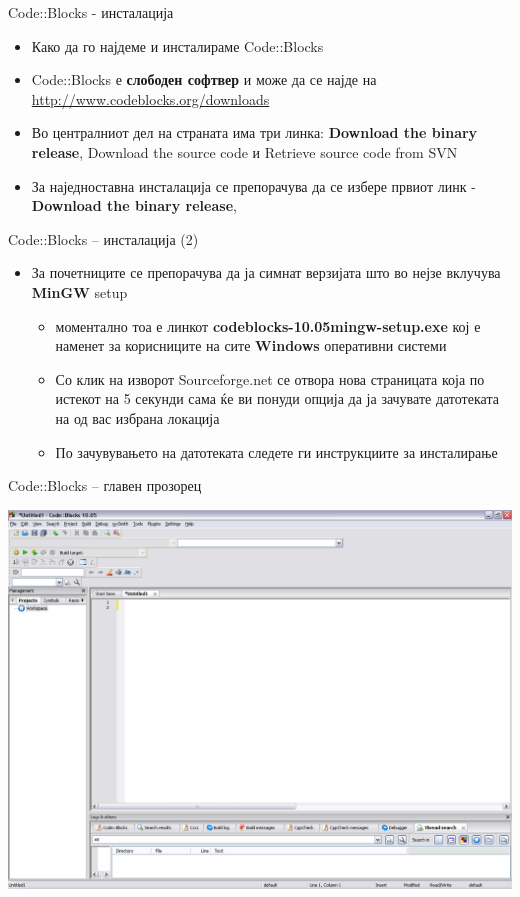 \begin{frame}{Code::Blocks - инсталација}
\begin{itemize}
  \item Како да го најдеме и инсталираме Code::Blocks
  \item Code::Blocks е \textbf{слободен софтвер} и може да се најде на
  \href{http://www.codeblocks.org/downloads}{http://www.codeblocks.org/downloads}
  \item Во централниот дел на страната има три линка: \textbf{Download the binary release}, Download the source code и Retrieve source code from SVN
  \item За наједноставна инсталација се препорачува да се избере првиот линк -
  \textbf{Download the binary release},
\end{itemize}
\end{frame}

\begin{frame}{Code::Blocks – инсталација (2)}
\begin{itemize}
  \item За почетниците се препорачува да ја симнат верзијата што во нејзе
  вклучува \textbf{MinGW} setup
    \begin{itemize}
  \item моментално тоа е линкот \textbf{codeblocks-10.05mingw-setup.exe} кој е наменет за
  корисниците на сите \textbf{Windows} оперативни системи
  \item Со клик на изворот Sourceforge.net се отвора нова страницата која по
  истекот на 5 секунди сама ќе ви понуди опција да ја зачувате датотеката на од вас избрана локација
  \item По зачувувањето на датотеката следете ги инструкциите за инсталирање
    \end{itemize}
\end{itemize}
\end{frame}

\begin{frame}{Code::Blocks – главен прозорец}
\begin{center}
\includegraphics[scale=0.26]{images/cb_main}
\end{center}
\end{frame}


